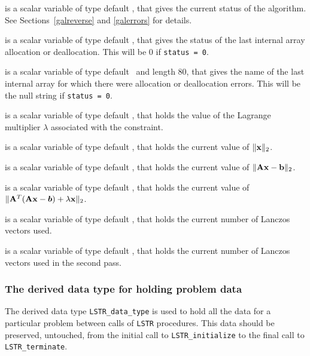 \documentclass{galahad}
\newcommand{\packagename}{LS\-TR}
\begin{document}
\begin{description}
 is a scalar variable of type default \integer, that gives the
current status of the algorithm. See Sections~\ref{galreverse} and
\ref{galerrors} for details.

 is a scalar variable of type default \integer,
that gives the status of the last internal array allocation
or deallocation. This will be 0 if {\tt status = 0}.

 is a scalar variable of type default \character\
and length 80, that  gives the name of the last internal array
for which there were allocation or deallocation errors.
This will be the null string if {\tt status = 0}.

 is a scalar variable of type default
\realdp, that holds the
value of the Lagrange multiplier $\lambda$ associated with the constraint.

 is a scalar variable of type default \realdp,
that holds the current value of $\|{\mathbf{x}}\|_2$.

 is a scalar variable of type default \realdp,
that holds the current value of $\|{\mathbf{A}}{\mathbf{x}}-{\mathbf{b}}\|_2$.

 is a scalar variable of type default \realdp,
that holds the current value of
$\|{\mathbf{A}}^T ( {\mathbf{A}} {\mathbf{x}} - \bm b ) + \lambda {\mathbf{x}} \|_2$.

 is a scalar variable of type default \integer, that holds the
current number of Lanczos vectors used.

 is a scalar variable of type default \integer, that holds the
current number of Lanczos vectors used in the second pass.

\end{description}


\subsubsection{The derived data type for holding problem data}\label{typedata}
The derived data type
{\tt \packagename\_data\_type}
is used to hold all the data for a particular problem between calls of
{\tt \packagename} procedures.
This data should be preserved, untouched, from the initial call to
{\tt \packagename\_initialize}
to the final call to
{\tt \packagename\_terminate}.

\end{document}
